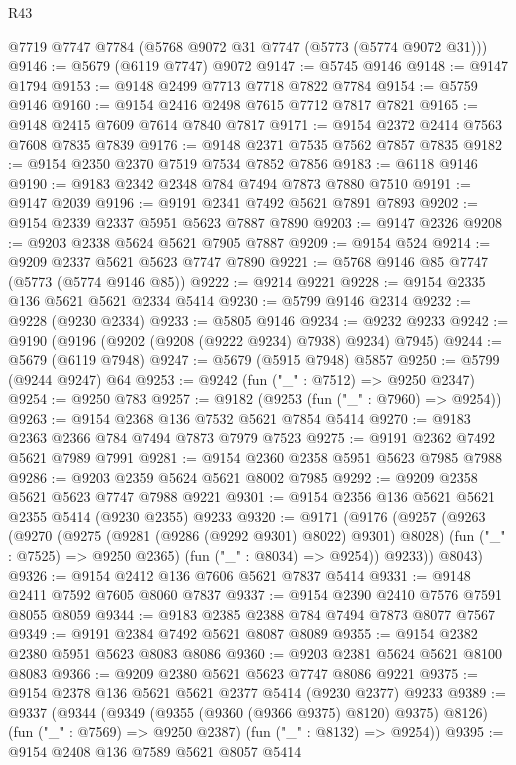 \begin{lexlean}{R43}
\begin{coremodule}
    @7719
    @7747
    @7784
    (@5768 @9072 @31 @7747 (@5773 (@5774 @9072 @31)))
@9146 := @5679 (@6119 @7747) @9072
@9147 := @5745 @9146
@9148 := @9147 @1794
@9153 := @9148 @2499 @7713 @7718 @7822 @7784
@9154 := @5759 @9146
@9160 := @9154 @2416 @2498 @7615 @7712 @7817 @7821
@9165 := @9148 @2415 @7609 @7614 @7840 @7817
@9171 := @9154 @2372 @2414 @7563 @7608 @7835 @7839
@9176 := @9148 @2371 @7535 @7562 @7857 @7835
@9182 := @9154 @2350 @2370 @7519 @7534 @7852 @7856
@9183 := @6118 @9146
@9190 := @9183 @2342 @2348 @784 @7494 @7873 @7880 @7510
@9191 := @9147 @2039
@9196 := @9191 @2341 @7492 @5621 @7891 @7893
@9202 := @9154 @2339 @2337 @5951 @5623 @7887 @7890
@9203 := @9147 @2326
@9208 := @9203 @2338 @5624 @5621 @7905 @7887
@9209 := @9154 @524
@9214 := @9209 @2337 @5621 @5623 @7747 @7890
@9221 := @5768 @9146 @85 @7747 (@5773 (@5774 @9146 @85))
@9222 := @9214 @9221
@9228 := @9154 @2335 @136 @5621 @5621 @2334 @5414
@9230 := @5799 @9146 @2314
@9232 := @9228 (@9230 @2334)
@9233 := @5805 @9146
@9234 := @9232 @9233
@9242 := @9190 (@9196 (@9202 (@9208 (@9222 @9234) @7938) @9234) @7945)
@9244 := @5679 (@6119 @7948)
@9247 := @5679 (@5915 @7948) @5857
@9250 := @5799 (@9244 @9247) @64
@9253 := @9242 (fun ("_" : @7512) => @9250 @2347)
@9254 := @9250 @783
@9257 := @9182 (@9253 (fun ("_" : @7960) => @9254))
@9263 := @9154 @2368 @136 @7532 @5621 @7854 @5414
@9270 := @9183 @2363 @2366 @784 @7494 @7873 @7979 @7523
@9275 := @9191 @2362 @7492 @5621 @7989 @7991
@9281 := @9154 @2360 @2358 @5951 @5623 @7985 @7988
@9286 := @9203 @2359 @5624 @5621 @8002 @7985
@9292 := @9209 @2358 @5621 @5623 @7747 @7988 @9221
@9301 := @9154 @2356 @136 @5621 @5621 @2355 @5414 (@9230 @2355) @9233
@9320 := @9171
    (@9176
      (@9257
        (@9263
          (@9270
            (@9275 (@9281 (@9286 (@9292 @9301) @8022) @9301) @8028)
            (fun ("_" : @7525) => @9250 @2365)
            (fun ("_" : @8034) => @9254))
          @9233))
      @8043)
@9326 := @9154 @2412 @136 @7606 @5621 @7837 @5414
@9331 := @9148 @2411 @7592 @7605 @8060 @7837
@9337 := @9154 @2390 @2410 @7576 @7591 @8055 @8059
@9344 := @9183 @2385 @2388 @784 @7494 @7873 @8077 @7567
@9349 := @9191 @2384 @7492 @5621 @8087 @8089
@9355 := @9154 @2382 @2380 @5951 @5623 @8083 @8086
@9360 := @9203 @2381 @5624 @5621 @8100 @8083
@9366 := @9209 @2380 @5621 @5623 @7747 @8086 @9221
@9375 := @9154 @2378 @136 @5621 @5621 @2377 @5414 (@9230 @2377) @9233
@9389 := @9337
    (@9344
      (@9349 (@9355 (@9360 (@9366 @9375) @8120) @9375) @8126)
      (fun ("_" : @7569) => @9250 @2387)
      (fun ("_" : @8132) => @9254))
@9395 := @9154 @2408 @136 @7589 @5621 @8057 @5414

\end{coremodule}
\end{lexlean}
